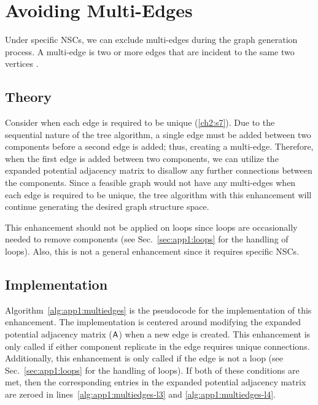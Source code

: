 \section{Avoiding Multi-Edges\label{sec:app1:multiedges}}

Under specific NSCs, we can exclude multi-edges during the graph generation process. A multi-edge is two or more edges that are incident to the same two vertices \cite[p.~25]{Diestel2000a}.

\subsection{Theory}

Consider when each edge is required to be unique (\ref{ch2:s7}).
Due to the sequential nature of the tree algorithm, a single edge must be added between two components before a second edge is added; thus, creating a multi-edge.
Therefore, when the first edge is added between two components, we can utilize the expanded potential adjacency matrix to disallow any further connections between the components.
Since a feasible graph would not have any multi-edges when each edge is required to be unique, the tree algorithm with this enhancement will continue generating the desired graph structure space.

This enhancement should not be applied on loops since loops are occasionally needed to remove components (see Sec.~\ref{sec:app1:loops} for the handling of loops). Also, this is not a general enhancement since it requires specific NSCs.

\subsection{Implementation}



Algorithm~\ref{alg:app1:multiedges} is the pseudocode for the implementation of this enhancement.
The implementation is centered around modifying the expanded potential adjacency matrix ($\textup{\textsf{A}}$) when a new edge is created.
This enhancement is only called if either component replicate in the edge requires unique connections.
Additionally, this enhancement is only called if the edge is not a loop (see Sec.~\ref{sec:app1:loops} for the handling of loops).
If both of these conditions are met, then the corresponding entries in the expanded potential adjacency matrix are zeroed in lines~\ref{alg:app1:multiedges-l3} and \ref{alg:app1:multiedges-l4}.

